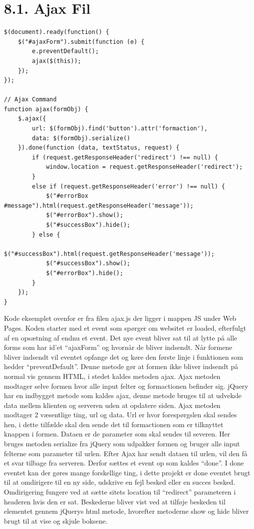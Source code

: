 \documentclass[11pt]{report}
\begin{document}
\section*{8.1. Ajax Fil}
\begin{lstlisting}
$(document).ready(function() {
    $("#ajaxForm").submit(function (e) {
        e.preventDefault();
        ajax($(this));
    });
});

// Ajax Command
function ajax(formObj) {
    $.ajax({
        url: $(formObj).find('button').attr('formaction'),
        data: $(formObj).serialize()
    }).done(function (data, textStatus, request) {
        if (request.getResponseHeader('redirect') !== null) {
            window.location = request.getResponseHeader('redirect');
        }
        else if (request.getResponseHeader('error') !== null) {
            $("#errorBox #message").html(request.getResponseHeader('message'));
            $("#errorBox").show();
            $("#successBox").hide();
        } else {
            $("#successBox").html(request.getResponseHeader('message'));
            $("#successBox").show();
            $("#errorBox").hide();
        }
    });
}
\end{lstlisting}
Kode eksemplet ovenfor er fra filen ajax.js der ligger i mappen JS under Web Pages. Koden starter med et event som spørger om websitet er loaded, efterfulgt af en opsætning af endnu et event. Det nye event bliver sat til at lytte på alle forms som har id’et “ajaxForm” og hvornår de bliver indsendt. Når formene bliver indsendt vil eventet opfange det og køre den første linje i funktionen som hedder “preventDefault”. Denne metode gør at formen ikke bliver indsendt på normal vis gennem HTML, i stedet kaldes metoden ajax. Ajax metoden modtager selve formen hvor alle input felter og formactionen befinder sig.
jQuery har en indbygget metode som kaldes ajax, denne metode bruges til at udveksle data mellem klienten og serveren uden at opdatere siden. Ajax metoden modtager 2 væsentlige ting, url og data. Url er hvor forespørgslen skal sendes hen, i dette tilfælde skal den sende det til formactionen som er tilknyttet knappen i formen. Dataen er de parameter som skal sendes til severen. Her bruges metoden serialize fra jQuery som udpakker formen og bruger alle input felterne som parameter til urlen. 
Efter Ajax har sendt dataen til urlen, vil den få et svar tilbage fra
serveren. Derfor sættes et event op som kaldes “done”.  I done eventet
kan der gøres mange forskellige ting, i dette projekt er done eventet
brugt til at omdirigere til en ny side, udskrive en fejl besked eller
en succes besked. Omdirigering fungere ved at sætte sitets location
til “redirect” parameteren i headeren hvis den er sat. Beskederne
bliver vist ved at tilføje beskeden til elementet gennem jQuerys html
metode, hvorefter metoderne show og hide bliver brugt til at vise og
skjule boksene. \\\\
\end{document}
